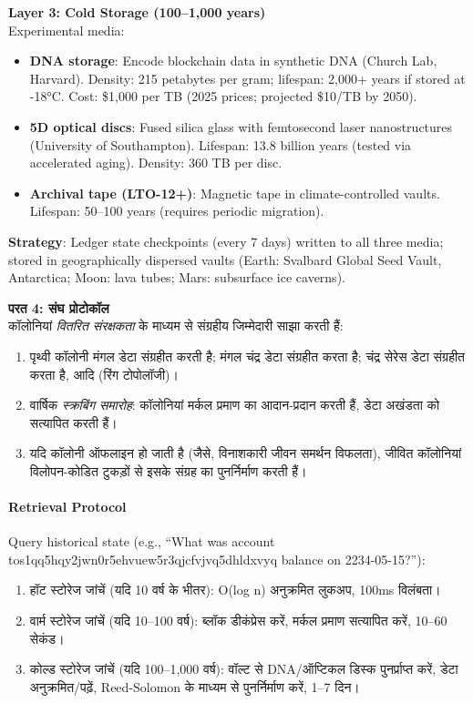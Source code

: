 \documentclass[11pt]{article}
\begin{document}
\begin{itemize}[noitemsep]
\begin{itemize}[noitemsep]
\textbf{Layer 3: Cold Storage (100--1,000 years)}\\
Experimental media:
\begin{itemize}[noitemsep]
  \item \textbf{DNA storage}: Encode blockchain data in synthetic DNA (Church Lab, Harvard). Density: 215 petabytes per gram; lifespan: 2,000+ years if stored at -18°C. Cost: \$1,000 per TB (2025 prices; projected \$10/TB by 2050).
  \item \textbf{5D optical discs}: Fused silica glass with femtosecond laser nanostructures (University of Southampton). Lifespan: 13.8 billion years (tested via accelerated aging). Density: 360 TB per disc.
  \item \textbf{Archival tape (LTO-12+)}: Magnetic tape in climate-controlled vaults. Lifespan: 50--100 years (requires periodic migration).
\end{itemize}
\textbf{Strategy}: Ledger state checkpoints (every 7 days) written to all three media; stored in geographically dispersed vaults (Earth: Svalbard Global Seed Vault, Antarctica; Moon: lava tubes; Mars: subsurface ice caverns).

\textbf{परत 4: संघ प्रोटोकॉल}\\
कॉलोनियां \emph{वितरित संरक्षकता} के माध्यम से संग्रहीय जिम्मेदारी साझा करती हैं:
\begin{enumerate}[noitemsep]
  \item पृथ्वी कॉलोनी मंगल डेटा संग्रहीत करती है; मंगल चंद्र डेटा संग्रहीत करता है; चंद्र सेरेस डेटा संग्रहीत करता है, आदि (रिंग टोपोलॉजी)।
  \item वार्षिक \emph{स्क्रबिंग समारोह}: कॉलोनियां मर्कल प्रमाण का आदान-प्रदान करती हैं, डेटा अखंडता को सत्यापित करती हैं।
  \item यदि कॉलोनी ऑफलाइन हो जाती है (जैसे, विनाशकारी जीवन समर्थन विफलता), जीवित कॉलोनियां विलोपन-कोडित टुकड़ों से इसके संग्रह का पुनर्निर्माण करती हैं।
\end{enumerate}

\paragraph{Retrieval Protocol}
Query historical state (e.g., ``What was account tos1qq5hqy2jwn0r5ehvuew5r3qjcfvjvq5dhldxvyq balance on 2234-05-15?''):
\begin{enumerate}[noitemsep]
  \item हॉट स्टोरेज जांचें (यदि 10 वर्ष के भीतर): O(log n) अनुक्रमित लुकअप, 100ms विलंबता।
  \item वार्म स्टोरेज जांचें (यदि 10--100 वर्ष): ब्लॉक डीकंप्रेस करें, मर्कल प्रमाण सत्यापित करें, 10--60 सेकंड।
  \item कोल्ड स्टोरेज जांचें (यदि 100--1,000 वर्ष): वॉल्ट से DNA/ऑप्टिकल डिस्क पुनर्प्राप्त करें, डेटा अनुक्रमित/पढ़ें, Reed-Solomon के माध्यम से पुनर्निर्माण करें, 1--7 दिन।
\end{enumerate}


\end{itemize}
\end{itemize}
\end{document}
